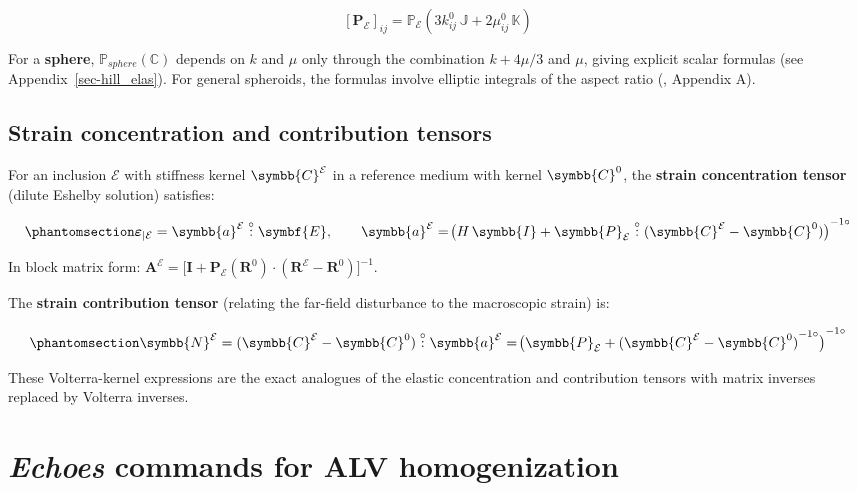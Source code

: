 \documentclass[
  a4paper,
  numbers=noendperiod,
  DIV=12]{scrreprt}
\newcommand{\uu}[1]{{\symbf{{#1}}}}
\newcommand{\uuuu}[1]{{\symbb{{#1}}}}
\newcommand{\volt}[1]{{#1}^{-1\circ}}
\newcommand{\dcirc}{\overset{\circ}{:}}
\begin{document}
\[
[\mathbf{P}_\mathcal{E}]_{ij} = \mathbb{P}_\mathcal{E}\!\left(3k^0_{ij}\,\mathbb{J}+2\mu^0_{ij}\,\mathbb{K}\right)
\]

For a \textbf{sphere}, \(\mathbb{P}_{sphere}(\mathbb{C})\) depends on
\(k\) and \(\mu\) only through the combination \(k+4\mu/3\) and \(\mu\),
giving explicit scalar formulas (see Appendix~\ref{sec-hill_elas}). For
general spheroids, the formulas involve elliptic integrals of the aspect
ratio (,
Appendix A).

\subsection{Strain concentration and contribution
tensors}\label{strain-concentration-and-contribution-tensors}

For an inclusion \(\mathcal{E}\) with stiffness kernel
\(\uuuu{C}^\mathcal{E}\) in a reference medium with kernel
\(\uuuu{C}^0\), the \textbf{strain concentration tensor} (dilute Eshelby
solution) satisfies:

\begin{equation}\protect\phantomsection\label{eq-alv-concentration}{
\boldsymbol{\varepsilon}_{|\mathcal{E}} = \uuuu{a}^\mathcal{E} \dcirc \uu{E},
\qquad
\uuuu{a}^\mathcal{E} = \volt{\!\bigl(H\,\uuuu{I} + \uuuu{P}_\mathcal{E} \dcirc (\uuuu{C}^\mathcal{E} - \uuuu{C}^0)\bigr)}
}\end{equation}

In block matrix form:
\(\mathbf{A}^\mathcal{E} = \bigl[\mathbf{I} + \mathbf{P}_\mathcal{E}(\mathbf{R}^0)\cdot(\mathbf{R}^\mathcal{E} - \mathbf{R}^0)\bigr]^{-1}\).

The \textbf{strain contribution tensor} (relating the far-field
disturbance to the macroscopic strain) is:

\begin{equation}\protect\phantomsection\label{eq-alv-contribution}{
\uuuu{N}^\mathcal{E} = (\uuuu{C}^\mathcal{E} - \uuuu{C}^0) \dcirc \uuuu{a}^\mathcal{E}
= \volt{\!\bigl(\uuuu{P}_\mathcal{E} + \volt{(\uuuu{C}^\mathcal{E} - \uuuu{C}^0)}\bigr)}
}\end{equation}

These Volterra-kernel expressions are the exact analogues of the elastic
concentration and contribution tensors with matrix inverses replaced by
Volterra inverses.

\section{\texorpdfstring{\emph{Echoes} commands for ALV
homogenization}{Echoes commands for ALV homogenization}}\label{sec-visco-echoes}
\end{document}
